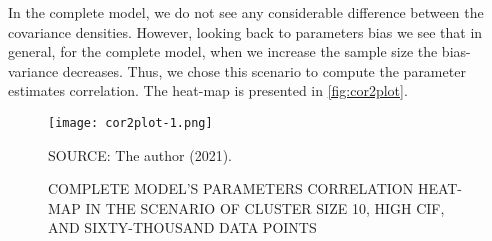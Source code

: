 In the complete model, we do not see any considerable difference between
the covariance densities. However, looking back to parameters bias we
see that in general, for the complete model, when we increase the sample
size the bias-variance decreases. Thus, we chose this scenario to
compute the parameter estimates correlation. The heat-map is presented
in \autoref{fig:cor2plot}.

\begin{center}
\begin{figure}[H]
 \setlength{\abovecaptionskip}{.0001pt}
 \caption{COMPLETE MODEL'S PARAMETERS CORRELATION HEAT-MAP IN THE
          SCENARIO OF CLUSTER SIZE 10, HIGH CIF, AND SIXTY-THOUSAND DATA
          POINTS}
 \centering
 \texttt{[image: cor2plot-1.png]}\\
 \vspace{-0.2cm}
 \begin{footnotesize}
  SOURCE: The author (2021).
 \end{footnotesize}
 \label{fig:cor2plot}
\end{figure}
\end{center}

